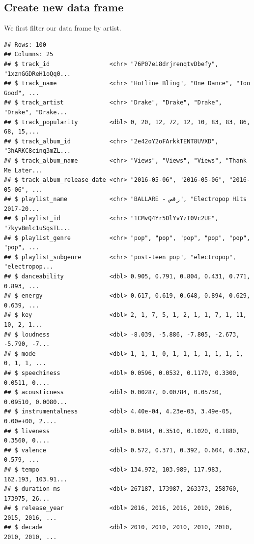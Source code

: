 \documentclass[
]{book}
\newenvironment{Shaded}{\begin{snugshade}}{\end{snugshade}}
\newcommand{\CommentTok}[1]{\textcolor[rgb]{0.56,0.35,0.01}{\textit{#1}}}
\newcommand{\KeywordTok}[1]{\textcolor[rgb]{0.13,0.29,0.53}{\textbf{#1}}}
\newcommand{\NormalTok}[1]{#1}
\newcommand{\OperatorTok}[1]{\textcolor[rgb]{0.81,0.36,0.00}{\textbf{#1}}}
\newcommand{\StringTok}[1]{\textcolor[rgb]{0.31,0.60,0.02}{#1}}
\begin{document}
\hypertarget{create-new-data-frame}{%
\subsection{Create new data frame}\label{create-new-data-frame}}

We first filter our data frame by artist.

\begin{Shaded}
\end{Shaded}

\begin{verbatim}
## Rows: 100
## Columns: 25
## $ track_id                 <chr> "76P07ei8drjrenqtvDbefy", "1xznGGDReH1oQq0...
## $ track_name               <chr> "Hotline Bling", "One Dance", "Too Good", ...
## $ track_artist             <chr> "Drake", "Drake", "Drake", "Drake", "Drake...
## $ track_popularity         <dbl> 0, 20, 12, 72, 12, 10, 83, 83, 86, 68, 15,...
## $ track_album_id           <chr> "2e42oY2oFArkkTENT8UVXD", "3hARKC8cinq3mZL...
## $ track_album_name         <chr> "Views", "Views", "Views", "Thank Me Later...
## $ track_album_release_date <chr> "2016-05-06", "2016-05-06", "2016-05-06", ...
## $ playlist_name            <chr> "BALLARE - رقص", "Electropop Hits  2017-20...
## $ playlist_id              <chr> "1CMvQ4Yr5DlYvYzI0Vc2UE", "7kyvBmlc1uSqsTL...
## $ playlist_genre           <chr> "pop", "pop", "pop", "pop", "pop", "pop", ...
## $ playlist_subgenre        <chr> "post-teen pop", "electropop", "electropop...
## $ danceability             <dbl> 0.905, 0.791, 0.804, 0.431, 0.771, 0.893, ...
## $ energy                   <dbl> 0.617, 0.619, 0.648, 0.894, 0.629, 0.639, ...
## $ key                      <dbl> 2, 1, 7, 5, 1, 2, 1, 1, 7, 1, 11, 10, 2, 1...
## $ loudness                 <dbl> -8.039, -5.886, -7.805, -2.673, -5.790, -7...
## $ mode                     <dbl> 1, 1, 1, 0, 1, 1, 1, 1, 1, 1, 1, 0, 1, 1, ...
## $ speechiness              <dbl> 0.0596, 0.0532, 0.1170, 0.3300, 0.0511, 0....
## $ acousticness             <dbl> 0.00287, 0.00784, 0.05730, 0.09510, 0.0080...
## $ instrumentalness         <dbl> 4.40e-04, 4.23e-03, 3.49e-05, 0.00e+00, 2....
## $ liveness                 <dbl> 0.0484, 0.3510, 0.1020, 0.1880, 0.3560, 0....
## $ valence                  <dbl> 0.572, 0.371, 0.392, 0.604, 0.362, 0.579, ...
## $ tempo                    <dbl> 134.972, 103.989, 117.983, 162.193, 103.91...
## $ duration_ms              <dbl> 267187, 173987, 263373, 258760, 173975, 26...
## $ release_year             <dbl> 2016, 2016, 2016, 2010, 2016, 2015, 2016, ...
## $ decade                   <dbl> 2010, 2010, 2010, 2010, 2010, 2010, 2010, ...
\end{verbatim}
\end{document}
